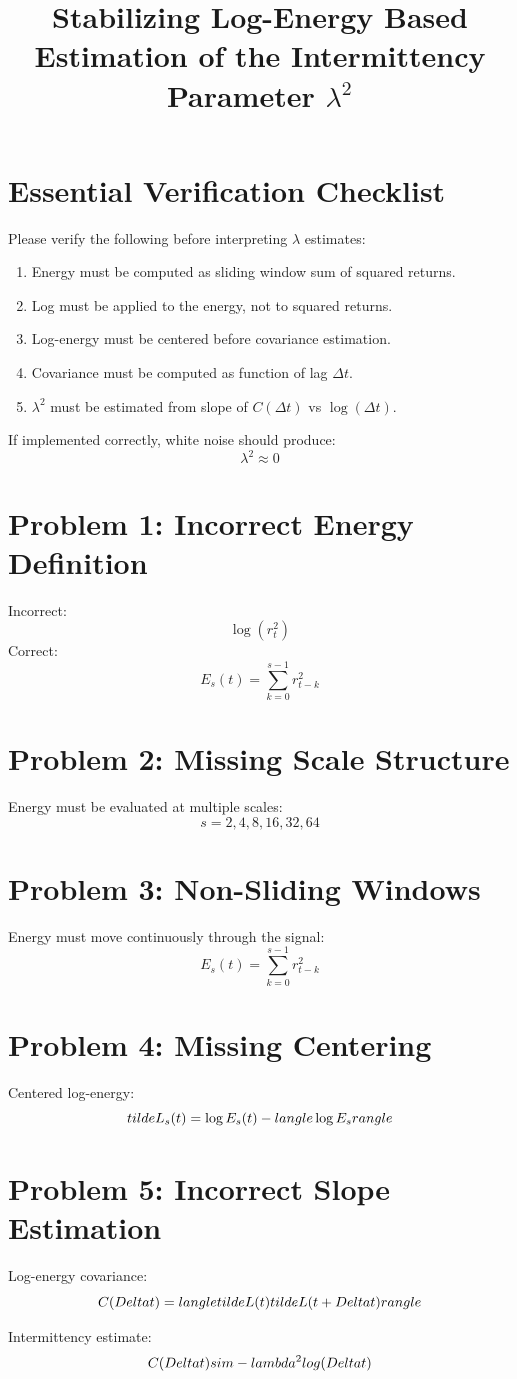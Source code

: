 \documentclass{article}
\title{Stabilizing Log-Energy Based Estimation of the Intermittency Parameter $\lambda^2$}
\date{}
\begin{document}
\maketitle

\section*{Essential Verification Checklist}

Please verify the following before interpreting $\lambda$ estimates:

\begin{enumerate}
\item Energy must be computed as sliding window sum of squared returns.
\item Log must be applied to the energy, not to squared returns.
\item Log-energy must be centered before covariance estimation.
\item Covariance must be computed as function of lag $\Delta t$.
\item $\lambda^2$ must be estimated from slope of $C(\Delta t)$ vs $\log(\Delta t)$.
\end{enumerate}

If implemented correctly, white noise should produce:
\[
\lambda^2 \approx 0
\]

\section{Problem 1: Incorrect Energy Definition}
Incorrect:
\[
\log(r_t^2)
\]
Correct:
\[
E_s(t) = \sum_{k=0}^{s-1} r_{t-k}^2
\]

\section{Problem 2: Missing Scale Structure}
Energy must be evaluated at multiple scales:
\[
s = 2,4,8,16,32,64
\]

\section{Problem 3: Non-Sliding Windows}
Energy must move continuously through the signal:
\[
E_s(t) = \sum_{k=0}^{s-1} r_{t-k}^2
\]

\section{Problem 4: Missing Centering}
Centered log-energy:
\[
\\tilde{L}_s(t) = \log E_s(t) - \\langle \log E_s \\rangle
\]

\section{Problem 5: Incorrect Slope Estimation}
Log-energy covariance:
\[
C(\\Delta t) = \\langle \\tilde{L}(t)\\tilde{L}(t+\\Delta t) \\rangle
\]

Intermittency estimate:
\[
C(\\Delta t) \\sim -\\lambda^2 \\log(\\Delta t)
\]
\end{document}
